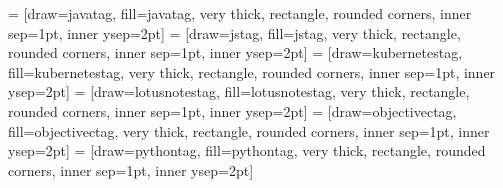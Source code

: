 \newcommand{\iostag}{\begin{tikzpicture}\node [iostag] (box){{\scriptsize \textbf{\phantom{|}iOS\phantom{|}}}};\end{tikzpicture}}
 = [draw=javatag, fill=javatag, very thick, rectangle, rounded corners, inner sep=1pt, inner ysep=2pt]
\newcommand{\javatag}{\begin{tikzpicture}\node [javatag] (box){{\scriptsize \textbf{\phantom{|}Java\phantom{|}}}};\end{tikzpicture}}
 = [draw=jstag, fill=jstag, very thick, rectangle, rounded corners, inner sep=1pt, inner ysep=2pt]
\newcommand{\jstag}{\begin{tikzpicture}\node [jstag] (box){{\scriptsize \textbf{\phantom{|}JS\phantom{|}}}};\end{tikzpicture}}
 = [draw=kubernetestag, fill=kubernetestag, very thick, rectangle, rounded corners, inner sep=1pt, inner ysep=2pt]
\newcommand{\kubernetestag}{\begin{tikzpicture}\node [kubernetestag] (box){{\scriptsize \color{white}{\textbf{\phantom{|}Kubernetes\phantom{|}}}}};\end{tikzpicture}}
 = [draw=lotusnotestag, fill=lotusnotestag, very thick, rectangle, rounded corners, inner sep=1pt, inner ysep=2pt]
\newcommand{\lotusnotestag}{\begin{tikzpicture}\node [lotusnotestag] (box){{\scriptsize \textbf{\phantom{|}Lotus Notes\phantom{|}}}};\end{tikzpicture}}
 = [draw=objectivectag, fill=objectivectag, very thick, rectangle, rounded corners, inner sep=1pt, inner ysep=2pt]
\newcommand{\objectivectag}{\begin{tikzpicture}\node [objectivectag] (box){{\scriptsize \textbf{\phantom{|}Objective-C\phantom{|}}}};\end{tikzpicture}}
 = [draw=pythontag, fill=pythontag, very thick, rectangle, rounded corners, inner sep=1pt, inner ysep=2pt]
\newcommand{\pythontag}{\begin{tikzpicture}\node [pythontag] (box){{\scriptsize \textbf{\phantom{|}Python\phantom{|}}}};\end{tikzpicture}}
